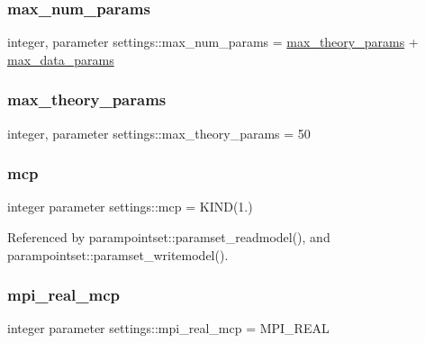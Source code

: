 \subsubsection{\texorpdfstring{max\+\_\+num\+\_\+params}{max\_num\_params}}
{\footnotesize\ttfamily integer, parameter settings\+::max\+\_\+num\+\_\+params = \mbox{\hyperlink{namespacesettings_a7884cd47680ca4079d2177f93eb41772}{max\+\_\+theory\+\_\+params}} + \mbox{\hyperlink{namespacesettings_a4d2d308b7b3d47f91cd40d6c735b4d99}{max\+\_\+data\+\_\+params}}}

\mbox{\label{namespacesettings_a7884cd47680ca4079d2177f93eb41772}} 
\subsubsection{\texorpdfstring{max\+\_\+theory\+\_\+params}{max\_theory\_params}}
{\footnotesize\ttfamily integer, parameter settings\+::max\+\_\+theory\+\_\+params = 50}

\mbox{\label{namespacesettings_a341fa0fe410054f78630c33e118669bf}} 
\subsubsection{\texorpdfstring{mcp}{mcp}}
{\footnotesize\ttfamily integer parameter settings\+::mcp = K\+I\+ND(1.)}



Referenced by parampointset\+::paramset\+\_\+readmodel(), and parampointset\+::paramset\+\_\+writemodel().

\mbox{\label{namespacesettings_aa6d55f83efe636882451ee1240bf4929}} 
\subsubsection{\texorpdfstring{mpi\+\_\+real\+\_\+mcp}{mpi\_real\_mcp}}
{\footnotesize\ttfamily integer parameter settings\+::mpi\+\_\+real\+\_\+mcp = M\+P\+I\+\_\+\+R\+E\+AL}



